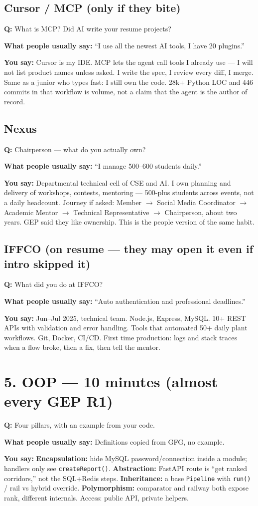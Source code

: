 \documentclass[a4paper,9.5pt]{extarticle}
\newcommand{\Q}[1]{\par\vspace{1.5pt}\noindent\textcolor{hot}{\textbf{Q:} #1}\par}
\newcommand{\Typ}[1]{\noindent\textcolor{muted}{\textbf{What people usually say:} #1}\par}
\newcommand{\Say}[1]{\noindent\textcolor{ok}{\textbf{You say:} #1}\par}
\begin{document}
\subsection{Cursor / MCP (only if they bite)}
\Q{What is MCP? Did AI write your resume projects?}
\Typ{``I use all the newest AI tools, I have 20 plugins.''}
\Say{Cursor is my IDE. MCP lets the agent call tools I already use --- I will not list product names unless asked. I write the spec, I review every diff, I merge. Same as a junior who types fast: I still own the code. 28k+ Python LOC and 446 commits in that workflow is volume, not a claim that the agent is the author of record.}

\subsection{Nexus}
\Q{Chairperson --- what do you actually own?}
\Typ{``I manage 500--600 students daily.''}
\Say{Departmental technical cell of CSE and AI. I own planning and delivery of workshops, contests, mentoring --- 500-plus students across events, not a daily headcount. Journey if asked: Member $\to$ Social Media Coordinator $\to$ Academic Mentor $\to$ Technical Representative $\to$ Chairperson, about two years. GEP said they like ownership. This is the people version of the same habit.}

\subsection{IFFCO (on resume --- they may open it even if intro skipped it)}
\Q{What did you do at IFFCO?}
\Typ{``Auto authentication and professional deadlines.''}
\Say{Jun--Jul 2025, technical team. Node.js, Express, MySQL. 10+ REST APIs with validation and error handling. Tools that automated 50+ daily plant workflows. Git, Docker, CI/CD. First time production: logs and stack traces when a flow broke, then a fix, then tell the mentor.}

\section{5. OOP --- 10 minutes (almost every GEP R1)}
\Q{Four pillars, with an example from your code.}
\Typ{Definitions copied from GFG, no example.}
\Say{\textbf{Encapsulation:} hide MySQL password/connection inside a module; handlers only see \texttt{createReport()}. \textbf{Abstraction:} FastAPI route is ``get ranked corridors,'' not the SQL+Redis steps. \textbf{Inheritance:} a base \texttt{Pipeline} with \texttt{run()} / rail vs hybrid override. \textbf{Polymorphism:} comparator and railway both expose rank, different internals. Access: public API, private helpers.}
\end{document}
